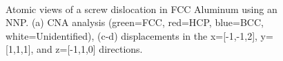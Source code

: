 \documentclass{article}
\begin{document}
\begin{figure}[H]%
\centering%
%
%
\\
%
%
\caption{Atomic views of a screw dislocation in FCC Aluminum using an NNP. (a) CNA analysis (green=FCC, red=HCP, blue=BCC, white=Unidentified), (c-d) displacements in the x=[-1,-1,2], y=[1,1,1], and z=[-1,1,0] directions. }
\label{fig:screwdislocation_views}
\end{figure}
\end{document}
